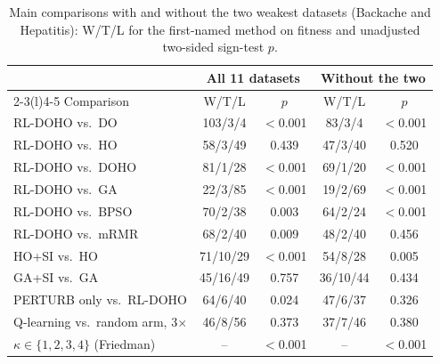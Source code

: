 \documentclass[journal]{IEEEtran}
\begin{document}
\begin{table}[t]
\centering
\caption{Main comparisons with and without the two weakest datasets (Backache and Hepatitis): W/T/L for the first-named method on fitness and unadjusted two-sided sign-test $p$.}
\label{tab:weak}
\footnotesize
\setlength{\tabcolsep}{2.4pt}
\begin{tabular}{@{}lcccc@{}}
\toprule
& \multicolumn{2}{c}{All 11 datasets} & \multicolumn{2}{c}{Without the two} \\
\cmidrule(lr){2-3}\cmidrule(l){4-5}
Comparison & W/T/L & $p$ & W/T/L & $p$ \\
\midrule
RL-DOHO vs.\ DO & 103/3/4 & $<$0.001 & 83/3/4 & $<$0.001 \\
RL-DOHO vs.\ HO & 58/3/49 & 0.439 & 47/3/40 & 0.520 \\
RL-DOHO vs.\ DOHO & 81/1/28 & $<$0.001 & 69/1/20 & $<$0.001 \\
RL-DOHO vs.\ GA & 22/3/85 & $<$0.001 & 19/2/69 & $<$0.001 \\
RL-DOHO vs.\ BPSO & 70/2/38 & 0.003 & 64/2/24 & $<$0.001 \\
RL-DOHO vs.\ mRMR & 68/2/40 & 0.009 & 48/2/40 & 0.456 \\
HO+SI vs.\ HO & 71/10/29 & $<$0.001 & 54/8/28 & 0.005 \\
GA+SI vs.\ GA & 45/16/49 & 0.757 & 36/10/44 & 0.434 \\
PERTURB only vs.\ RL-DOHO & 64/6/40 & 0.024 & 47/6/37 & 0.326 \\
Q-learning vs.\ random arm, 3$\times$ & 46/8/56 & 0.373 & 37/7/46 & 0.380 \\
$\kappa\in\{1,2,3,4\}$ (Friedman) & -- & $<$0.001 & -- & $<$0.001 \\
\bottomrule
\end{tabular}
\end{table}
\end{document}
